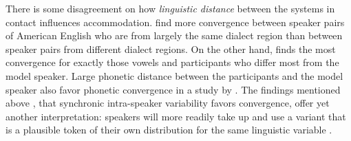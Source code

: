\documentclass[output=paper,
modfonts
]{langscibook}
\begin{document}
% 
% 
% 
% 
There is some disagreement on how \textit{linguistic distance} between the systems in contact influences accommodation. \cite{kim_phonetic_2011} find more convergence between speaker pairs of American English who are from largely the same dialect region than between speaker pairs from different dialect regions. On the other hand, \cite{babel_evidence_2012} finds the most convergence for exactly those vowels and participants who differ most from the model speaker. Large phonetic distance between the participants and the model speaker also favor phonetic convergence in a study by \cite{walker_repeat_2015}. The findings mentioned above \citep{beckner_participants_2016,bowie_effect_2000,watt_levels_2010}, that synchronic intra-speaker variability favors convergence, offer yet another interpretation: speakers will more readily take up and use a variant that is a plausible token of their own distribution for the same linguistic variable \citep[for evidence from an agent-based model, see][]{harrington_/u/-fronting_2017}. 
% 
% 
% 
% 
% 
% 
% 
% 
\end{document}
